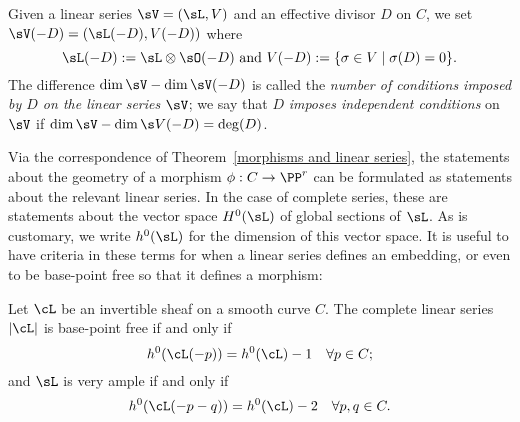 Given a linear series $\sV = (\sL, V)$ and an effective divisor $D$ on $C$, we  set
$
\sV(-D) = (\sL(-D),V(-D))
$
where
$$
\sL(-D): = \sL \otimes \sO(-D)\hbox{ and } V(-D) := \{ \sigma \in V \mid \sigma(D) = 0 \}.
$$
The difference $\dim \sV - \dim \sV(-D)$ is called the \emph{number of conditions imposed by $D$ on the linear series $\sV$}; we say that $D$ \emph{imposes independent conditions} on $\sV$ if $\dim \sV - \dim \s V(-D) = \deg(D)$.

Via the correspondence of Theorem~\ref{morphisms and linear series}, the statements about the geometry of a morphism $\phi : C \to \PP^r$ can be formulated as statements about the relevant linear series. In the case of complete series, these are statements about the vector space $H^{0}(\sL)$ of global sections of $\sL$. As is customary, we write $h^{0}(\sL)$ for the dimension of this vector space. It is useful to have criteria
in these terms for when a linear series defines an embedding, or even to be base-point free so that it
defines a morphism:

\begin{proposition}\label{very ample}\cite[Thm. IV.3.1]{H}
Let $\cL$ be an invertible sheaf on a smooth curve $C$. The complete linear series $|\cL|$ is base-point free if and only if
$$
h^0(\cL(-p)) = h^0(\cL) - 1 \quad \forall p \in C;
$$
and $\sL$ is very ample if and only if
$$
h^0(\cL(-p-q)) = h^0(\cL) - 2 \quad \forall p, q \in C.
$$
\end{proposition} 

